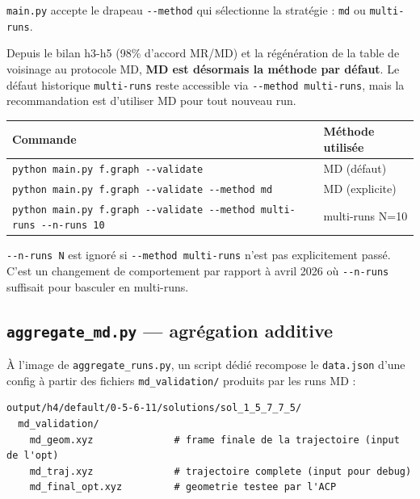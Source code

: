 \texttt{main.py} accepte le drapeau \texttt{-{}-method} qui sélectionne la stratégie :
\texttt{md} ou \texttt{multi-runs}.


Depuis le bilan h3-h5 (98\% d'accord MR/MD) et la régénération de la table de voisinage
au protocole MD, \textbf{MD est désormais la méthode par défaut}. Le défaut historique
\texttt{multi-runs} reste accessible via \texttt{-{}-method multi-runs}, mais la
recommandation est d'utiliser MD pour tout nouveau run.

\begin{center}
\begin{tabular}{ll}
  \toprule
  Commande & Méthode utilisée \\
  \midrule
  \texttt{python main.py f.graph -{}-validate}                   & MD (défaut) \\
  \texttt{python main.py f.graph -{}-validate -{}-method md}     & MD (explicite) \\
  \texttt{python main.py f.graph -{}-validate -{}-method multi-runs -{}-n-runs 10} & multi-runs N=10 \\
  \bottomrule
\end{tabular}
\end{center}

\begin{attention}
  \texttt{-{}-n-runs N} est ignoré si \texttt{-{}-method multi-runs} n'est pas explicitement
  passé. C'est un changement de comportement par rapport à avril 2026 où \texttt{-{}-n-runs}
  suffisait pour basculer en multi-runs.
\end{attention}

\subsection{\texttt{aggregate\_md.py} — agrégation additive}

À l'image de \texttt{aggregate\_runs.py}, un script dédié recompose le \texttt{data.json}
d'une config à partir des fichiers \texttt{md\_validation/} produits par les runs MD :

\begin{lstlisting}[style=benzai]
output/h4/default/0-5-6-11/solutions/sol_1_5_7_7_5/
  md_validation/
    md_geom.xyz              # frame finale de la trajectoire (input de l'opt)
    md_traj.xyz              # trajectoire complete (input pour debug)
    md_final_opt.xyz         # geometrie testee par l'ACP
\end{lstlisting}

